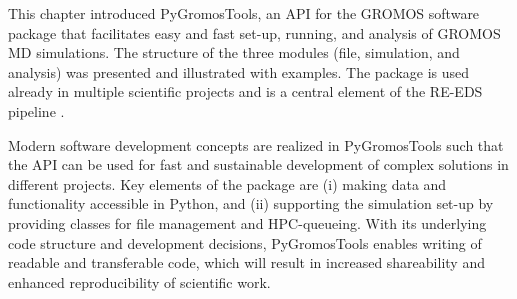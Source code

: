 This chapter introduced PyGromosTools, an API for the GROMOS software package that facilitates easy and fast set-up, running, and analysis of GROMOS MD simulations. The structure of the three modules (file, simulation, and analysis) was presented and illustrated with examples.  
The package is used already in multiple scientific projects and is a central element of the RE-EDS pipeline \cite{Ries2021B}. 

Modern software development concepts are realized in PyGromosTools such that the API can be used for fast and sustainable development of complex solutions in different projects. Key elements of the package are (i) making data and functionality accessible in Python, and (ii) supporting the simulation set-up by providing classes for file management and HPC-queueing. With its underlying code structure and development decisions, PyGromosTools enables writing of readable and transferable code, which will result in increased shareability and enhanced reproducibility of scientific work.  \cite{Walters2020}

\FloatBarrier